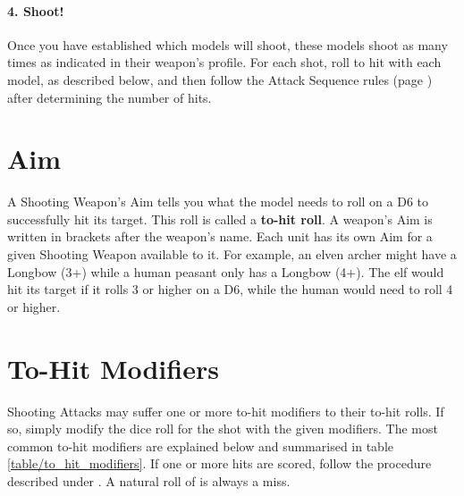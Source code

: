 \paragraph{4. Shoot!}

Once you have established which models will shoot, these models shoot as many times as indicated in their weapon's profile. For each shot, roll to hit with each model, as described below, and then follow the Attack Sequence rules (page \pageref{attack_sequence}) after determining the number of hits.

\section{Aim}
\label{aim}

A Shooting Weapon's Aim tells you what the model needs to roll on a D6 to successfully hit its target. This roll is called a \textbf{to-hit roll}. A weapon's Aim is written in brackets after the weapon's name. Each unit has its own Aim for a given Shooting Weapon available to it. For example, an elven archer might have a Longbow (3+) while a human peasant only has a Longbow (4+). The elf would hit its target if it rolls 3 or higher on a D6, while the human would need to roll 4 or higher.

\columnbreak

\section{To-Hit Modifiers}
\label{to_hit_modifiers}

Shooting Attacks may suffer one or more to-hit modifiers to their to-hit rolls. If so, simply modify the dice roll for the shot with the given modifiers. The most common to-hit modifiers are explained below and summarised in table \ref{table/to_hit_modifiers}. If one or more hits are scored, follow the procedure described under . A natural roll of  is always a miss.

